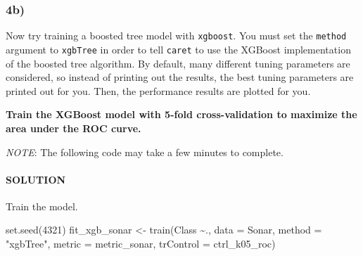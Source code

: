\documentclass[
]{article}
\newenvironment{Shaded}{\begin{snugshade}}{\end{snugshade}}
\newcommand{\AttributeTok}[1]{\textcolor[rgb]{0.77,0.63,0.00}{#1}}
\newcommand{\DecValTok}[1]{\textcolor[rgb]{0.00,0.00,0.81}{#1}}
\newcommand{\FunctionTok}[1]{\textcolor[rgb]{0.00,0.00,0.00}{#1}}
\newcommand{\NormalTok}[1]{#1}
\newcommand{\OtherTok}[1]{\textcolor[rgb]{0.56,0.35,0.01}{#1}}
\newcommand{\SpecialCharTok}[1]{\textcolor[rgb]{0.00,0.00,0.00}{#1}}
\newcommand{\StringTok}[1]{\textcolor[rgb]{0.31,0.60,0.02}{#1}}
\begin{document}
\hypertarget{b-3}{%
\subsubsection{4b)}\label{b-3}}

Now try training a boosted tree model with \texttt{xgboost}. You must
set the \texttt{method} argument to \texttt{xgbTree} in order to tell
\texttt{caret} to use the XGBoost implementation of the boosted tree
algorithm. By default, many different tuning parameters are considered,
so instead of printing out the results, the best tuning parameters are
printed out for you. Then, the performance results are plotted for you.

\textbf{Train the XGBoost model with 5-fold cross-validation to maximize
the area under the ROC curve.}

\emph{NOTE}: The following code may take a few minutes to complete.

\hypertarget{solution-18}{%
\paragraph{SOLUTION}\label{solution-18}}

Train the model.

\begin{Shaded}
\begin{Highlighting}[]
\FunctionTok{set.seed}\NormalTok{(}\DecValTok{4321}\NormalTok{)}
\NormalTok{fit\_xgb\_sonar }\OtherTok{\textless{}{-}} \FunctionTok{train}\NormalTok{(Class }\SpecialCharTok{\textasciitilde{}}\NormalTok{.,}
                       \AttributeTok{data =}\NormalTok{ Sonar,}
                       \AttributeTok{method =} \StringTok{"xgbTree"}\NormalTok{,}
                       \AttributeTok{metric =}\NormalTok{ metric\_sonar,}
                       \AttributeTok{trControl =}\NormalTok{ ctrl\_k05\_roc)}
\end{Highlighting}
\end{Shaded}
\end{document}
